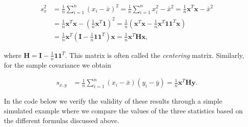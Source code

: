 \documentclass[12pt,]{krantz}
\begin{document}
\begin{equation*}
  \begin{aligned}
    s_x^2 &= \frac{1}{n} \sum_{i = 1}^n \left(x_i - \bar{x}\right)^2 = \frac{1}{n} \sum_{i = 1}^n x_i^2 - \bar{x}^2 = \frac{1}{n} \mathbf{x}^T \mathbf{x} - \bar{x}^2\\
    &= \frac{1}{n} \mathbf{x}^T \mathbf{x} - \left(\frac{1}{n} \mathbf{x}^T \mathbf{1}\right)^2 = \frac{1}{n} \left(\mathbf{x}^T \mathbf{x} - \frac{1}{n} \mathbf{x}^T \mathbf{1} \mathbf{1}^T \mathbf{x}\right)\\
    &= \frac{1}{n}\mathbf{x}^T \left( \mathbf{I} - \frac{1}{n} \mathbf{1} \mathbf{1}^T \right) \mathbf{x} = \frac{1}{n}\mathbf{x}^T \mathbf{H} \mathbf{x},
  \end{aligned}
\end{equation*}

where \(\mathbf{H} = \mathbf{I} - \frac{1}{n} \mathbf{1} \mathbf{1}^T\).
This matrix is often called the \emph{centering} matrix. Similarly, for
the sample covariance we obtain

\begin{equation*}
  \begin{aligned}
    s_{x,y} &= \frac{1}{n} \sum_{i = 1}^n \left(x_i - \bar{x}\right) \left(y_i - \bar{y}\right) = \frac{1}{n}\mathbf{x}^T \mathbf{H} \mathbf{y}.
  \end{aligned}
\end{equation*}

In the code below we verify the validity of these results through a
simple simulated example where we compare the values of the three
statistics based on the different formulas discussed above.
\end{document}
